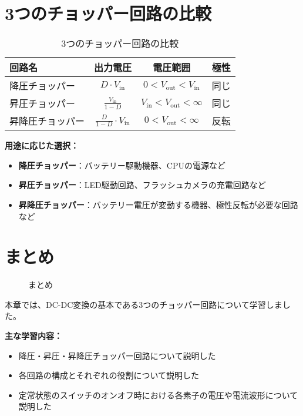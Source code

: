 \section{3つのチョッパー回路の比較}

\begin{table}[H]
\centering
\caption{3つのチョッパー回路の比較}
\begin{tabular}{|l|c|c|c|}
\hline
\textbf{回路名} & \textbf{出力電圧} & \textbf{電圧範囲} & \textbf{極性} \\
\hline
降圧チョッパー & $D \cdot V_{\text{in}}$ & $0 < V_{\text{out}} < V_{\text{in}}$ & 同じ \\
\hline
昇圧チョッパー & $\frac{V_{\text{in}}}{1-D}$ & $V_{\text{in}} < V_{\text{out}} < \infty$ & 同じ \\
\hline
昇降圧チョッパー & $\frac{D}{1-D} \cdot V_{\text{in}}$ & $0 < V_{\text{out}} < \infty$ & 反転 \\
\hline
\end{tabular}
\end{table}

\textbf{用途に応じた選択：}

\begin{itemize}
\item \textbf{降圧チョッパー}：バッテリー駆動機器、CPUの電源など
\item \textbf{昇圧チョッパー}：LED駆動回路、フラッシュカメラの充電回路など
\item \textbf{昇降圧チョッパー}：バッテリー電圧が変動する機器、極性反転が必要な回路など
\end{itemize}

\section{まとめ}

\begin{figure}[H]
\centering
{}
\caption{まとめ}
\label{fig:ch05_summary}
\end{figure}

本章では、DC-DC変換の基本である3つのチョッパー回路について学習しました。

\textbf{主な学習内容：}

\begin{itemize}
\item 降圧・昇圧・昇降圧チョッパー回路について説明した
\item 各回路の構成とそれぞれの役割について説明した
\item 定常状態のスイッチのオンオフ時における各素子の電圧や電流波形について説明した
\end{itemize}

